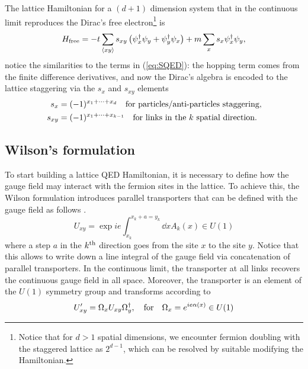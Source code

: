 \documentclass[a4paper]{report}
\begin{document}
\begin{spacing}{1.1}
The lattice Hamiltonian for a $(d+1)$ dimension system that in the continuous limit reproduces the Dirac's free electron\footnote{Notice that for $d > 1$ spatial dimensions, we encounter fermion doubling with the staggered lattice as $2^{d-1}$, which can be resolved by suitable modifying the Hamiltonian.} \cite{wiese2013ultracold} is 
\begin{equation} \label{eq:FreeLatH}
    H_{\textnormal{free}} = -t \sum_{\expval{xy}} s_{xy} \left(\psi_x^\dagger \psi_y + \psi_y^\dagger \psi_x \right) + m\sum_x s_x \psi_x^\dagger \psi_y,
\end{equation}
notice the similarities to the terms in (\ref{eq:SQED}): the hopping term comes from the finite difference derivatives, and now the Dirac's algebra is encoded to the lattice staggering via the $s_x$ and $s_{xy}$ elements
\begin{align}
    s_x &= (-1)^{x_1+\dots+x_d} \quad \textnormal{for particles/anti-particles staggering},\\
    s_{xy} &= (-1)^{x_1+\dots+x_{k-1}} \quad \textnormal{for links in the $k$ spatial direction}.
\end{align}



\subsection{Wilson's formulation}

To start building a lattice QED Hamiltonian, it is necessary to define how the gauge field may interact with the fermion sites in the lattice. To achieve this, the Wilson formulation introduces parallel transporters that can be defined with the gauge field as follows \cite{wiese2013ultracold}.
\begin{equation}
    U_{xy} = \exp{i e \int_{x_k}^{x_k+a = y_k}\dd x A_k(x)} \in U(1)
\end{equation}
where a step $a$ in the $k^\textnormal{th}$ direction goes from the site $x$ to the site $y$. Notice that this allows to write down a line integral of the gauge field via concatenation of parallel transporters. In the continuous limit, the transporter at all links recovers the continuous gauge field in all space. Moreover, the transporter is an element of the $U(1)$ symmetry group and transforms according to 
\begin{equation}
    U_{xy}' = \Omega_x U_{xy} \Omega_y^\dagger, \quad \textnormal{for} \quad \Omega_x = e^{ie\alpha(x)} \in U(1)
\end{equation}


\end{spacing}
\end{document}
